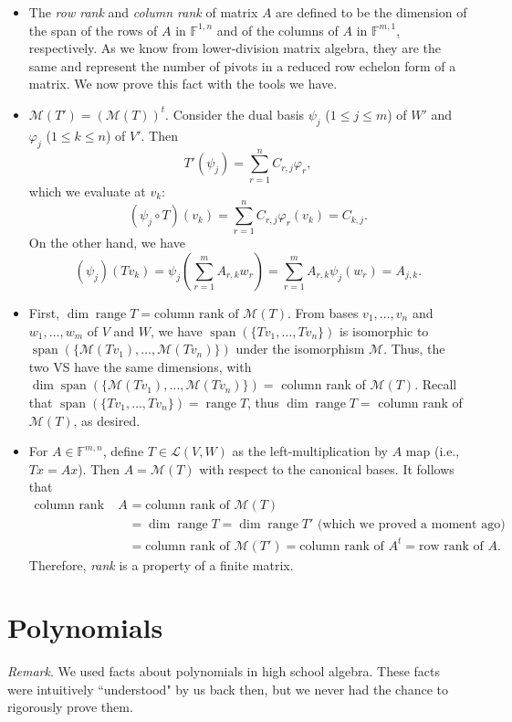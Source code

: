 \documentclass{article}
\newcommand{\F}{\mathbb{F}}
\newcommand{\s}{\operatorname{span}}
\renewcommand{\r}{\operatorname{range}}
\renewcommand{\d}{\dim}
\newcommand{\LVW}{\mathcal{L}(V,W)}
\newcommand{\M}{\mathcal{M}}
\newcommand{\bv}{v_1,\dots,v_n}
\renewcommand{\phi}{\varphi}
\begin{document}
\begin{itemize}
    \item The \textit{row rank} and \textit{column rank} of matrix $A$ are defined to be the dimension of the span of the rows of $A$ in $\F^{1,n}$ and of the columns of $A$ in $\F^{m,1}$, respectively. As we know from lower-division matrix algebra, they are the same and represent the number of pivots in a reduced row echelon form of a matrix. We now prove this fact with the tools we have.
    
    \item $\M(T') = (\M(T))^t$. Consider the dual basis $\psi_j$ ($1 \leq j \leq m$) of $W'$ and $\phi_j$ ($1 \leq k \leq n$) of $V'$. Then $$T'(\psi_j) = \sum_{r=1}^n C_{r,j}\phi_r,$$ which we evaluate at $v_k$: $$(\psi_j \circ T)(v_k) = \sum_{r=1}^n C_{r,j}\phi_r(v_k) = C_{k,j}.$$ On the other hand, we have $$(\psi_j)(Tv_k) = \psi_j(\sum_{r=1}^mA_{r,k}w_r) = \sum_{r=1}^m A_{r,k}\psi_j(w_r) = A_{j,k}.$$
    
    \item First, $\d \r T = \text{column rank of } \M(T)$. From bases $\bv$ and $w_1,\dots,w_m$ of $V$ and $W$, we have $\s(\{Tv_1,\dots,Tv_n\})$ is isomorphic to $\s(\{\M(Tv_1),\dots,\M(Tv_n)\})$ under the isomorphism $\M$. Thus, the two VS have the same dimensions, with $\d \s(\{\M(Tv_1),\dots,\M(Tv_n)\}) = $ column rank of $\M(T)$. Recall that $\s(\{Tv_1,\dots,Tv_n\}) = \r T$, thus $\d \r T = $ column rank of $\M(T)$, as desired.
    
    \item For $A \in \F^{m,n}$, define $T \in \LVW$ as the left-multiplication by $A$ map (i.e., $Tx = Ax$). Then $A = \M(T)$ with respect to the canonical bases. It follows that
    \begin{align*}
        \text{column rank of } A & = \text{column rank of } \M(T) \\
        & = \d \r T = \d \r T' \text{ (which we proved a moment ago)} \\
        & = \text{column rank of } \M(T') = \text{column rank of } A^t
        = \text{row rank of } A.
    \end{align*}
    Therefore, \textit{rank} is a property of a finite matrix.
\end{itemize}

\section{Polynomials}
\textit{Remark}. We used facts about polynomials in high school algebra. These facts were intuitively ``understood" by us back then, but we never had the chance to rigorously prove them.
\end{document}
